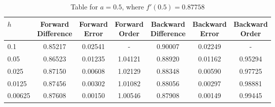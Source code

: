 \begin{table}
\centering
\caption{Table for $a = 0.5$, where $f'(0.5) = 0.87758$}
\begin{tabular}{lcccccc}
\toprule
    $h$ & \makecell{Forward \\ Difference} & \makecell{Forward \\ Error} & \makecell{Forward \\ Order} & \makecell{Backward \\ Difference} & \makecell{Backward \\ Error} & \makecell{Backward \\ Order} \\
\midrule
    0.1 &                          0.85217 &                     0.02541 &                           - &                           0.90007 &                      0.02249 &                            - \\
   0.05 &                          0.86523 &                     0.01235 &                     1.04121 &                           0.88920 &                      0.01162 &                      0.95294 \\
  0.025 &                          0.87150 &                     0.00608 &                     1.02129 &                           0.88348 &                      0.00590 &                      0.97725 \\
 0.0125 &                          0.87456 &                     0.00302 &                     1.01082 &                           0.88056 &                      0.00297 &                      0.98881 \\
0.00625 &                          0.87608 &                     0.00150 &                     1.00546 &                           0.87908 &                      0.00149 &                      0.99445 \\
\bottomrule
\end{tabular}
\end{table}
